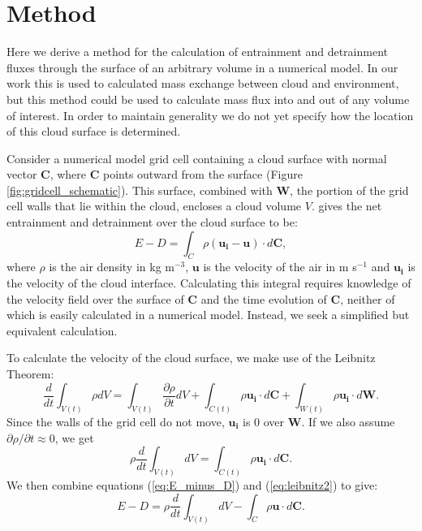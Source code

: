 \documentclass[12pt]{article}
\begin{document}

\section{Method}

Here we derive a method for the calculation of entrainment and detrainment
fluxes through the surface of an arbitrary volume in a numerical model.  In our 
work this is used to calculated mass exchange between cloud and environment, 
but this method could be used to calculate mass flux into and out of any volume 
of interest.  In order to maintain generality we do not yet specify how the 
location of this cloud surface is determined.

Consider a numerical model grid cell containing a cloud surface with normal 
vector $\mathbf{C}$, where $\mathbf{C}$ points outward from the surface (Figure 
\ref{fig:gridcell_schematic}).  This surface, combined with $\mathbf{W}$, the 
portion of the grid cell walls that lie within the cloud, encloses a cloud 
volume $V$.  \cite{Siebesma1998} gives the net entrainment and detrainment over 
the cloud surface to be:
\begin{equation}
\label{eq:E_minus_D} 
E - D = \int_C \rho ( \mathbf{u_i} -  \mathbf{u}) \cdot d\mathbf{C},
\end{equation}
where $\rho$ is the air density in kg m$^{-3}$, $\mathbf{u}$ is the velocity
of the air in m s$^{-1}$ and $\mathbf{u_i}$ is the velocity of the cloud 
interface.  Calculating this integral requires knowledge of the velocity field
over the surface of $\mathbf{C}$ and the time evolution of $\mathbf{C}$, 
neither of which is easily calculated in a numerical model.  Instead, we seek a
simplified but equivalent calculation.

To calculate the velocity of the cloud surface, we make use of the Leibnitz 
Theorem:
\begin{equation}
\label{eq:leibnitz} 
\frac{d}{dt}\int_{V(t)} \rho dV = 
  \int_{V(t)} \frac{\partial \rho}{ \partial t} dV 
  + \int_{C(t)} \rho \mathbf{u_i}\cdot d\mathbf{C}
  + \int_{W(t)} \rho \mathbf{u_i}\cdot d\mathbf{W}.
\end{equation}
Since the walls of the grid cell do not move, $\mathbf{u_i}$ is 0 over 
$\mathbf{W}$.  If we also assume ${\partial \rho}/{ \partial t} \approx 0$, we
get
\begin{equation}
\label{eq:leibnitz2} 
    \rho \frac{d}{dt}\int_{V(t)} dV = 
    \int_{C(t)} \rho \mathbf{u_i}\cdot d\mathbf{C}.
\end{equation}
We then combine equations (\ref{eq:E_minus_D}) and (\ref{eq:leibnitz2}) to give:
\begin{equation}
\label{eq:step1} 
      E - D = \rho \frac{d}{dt}\int_{V(t)} dV
            - \int_C \rho \mathbf{u} \cdot d\mathbf{C}.
\end{equation}
\end{document}
